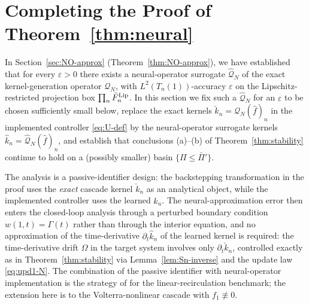 \documentclass[journal,twoside,web]{ieeecolor}
\begin{document}
\section{Completing the Proof of Theorem~\ref{thm:neural}}\label{sec:neural-closed-loop}

In Section~\ref{sec:NO-approx} (Theorem~\ref{thm:NO-approx}), we have established that for every $\varepsilon>0$ there exists a neural-operator surrogate $\widehat{\mathcal Q}_N$ of the exact kernel-generation operator $\mathcal Q_N$, with $L^2(T_n(1))$-accuracy $\varepsilon$ on the Lipschitz-restricted projection box $\prod_n \bar F_n^{\rm Lip}$. In this section we fix such a $\widehat{\mathcal Q}_N$ for an $\varepsilon$ to be chosen sufficiently small below, replace the exact kernels $\check k_n=\mathcal Q_N(\hat f)_n$ in the implemented controller \eqref{eq:U-def} by the neural-operator surrogate kernels $\hat k_n=\widehat{\mathcal Q}_N(\hat f)_n$, and establish that conclusions (a)--(b) of Theorem~\ref{thm:stability} continue to hold on a (possibly smaller) basin $\{\Pi\le\bar\Pi'\}$.

The analysis is a passive-identifier design: the backstepping transformation in the proof uses the \emph{exact} cascade kernel $\check k_n$ as an analytical object, while the implemented controller uses the learned $\hat k_n$. The neural-approximation error then enters the closed-loop analysis through a perturbed boundary condition $w(1,t)=\Gamma(t)$ rather than through the interior equation, and no approximation of the time-derivative $\partial_t\hat k_n$ of the learned kernel is required: the time-derivative drift $\Omega$ in the target system involves only $\partial_t\check k_n$, controlled exactly as in Theorem~\ref{thm:stability} via Lemma~\ref{lem:Sn-inverse} and the update law \eqref{eq:upd1-N}. The combination of the passive identifier with neural-operator implementation is the strategy of \cite[\S7]{LBSK} for the linear-recirculation benchmark; the extension here is to the Volterra-nonlinear cascade with $f_1\not\equiv 0$.
\end{document}
